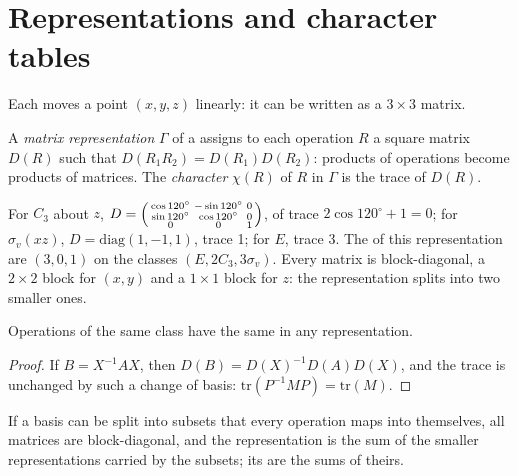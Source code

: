 \section{Representations and character tables}

Each  moves a point $(x, y, z)$ linearly: it can be written
as a $3\times3$ matrix.

\begin{definition}\label{def:b3:point-groups:representation}
A \emph{matrix representation} $\Gamma$ of a
 assigns to each operation $R$ a square matrix $D(R)$ such that
$D(R_1R_2) = D(R_1)D(R_2)$: products of operations become products of
matrices. The \emph{character} $\chi(R)$ of $R$ in $\Gamma$ is
the trace of $D(R)$.
\end{definition}

\begin{example}\label{ex:b3:point-groups:xyz}
For $C_3$ about $z$, $D = \begin{psmallmatrix}\cos120^\circ & -\sin120^\circ &
0\\ \sin120^\circ & \cos120^\circ & 0\\ 0 & 0 & 1\end{psmallmatrix}$, of trace
$2\cos120^\circ + 1 = 0$; for $\sigma_v(xz)$, $D = \mathrm{diag}(1, -1, 1)$, trace
1; for $E$, trace 3. The  of this representation are $(3, 0, 1)$ on
the classes $(E, 2C_3, 3\sigma_v)$. Every matrix is block-diagonal, a
$2\times2$ block for $(x, y)$ and a $1\times1$ block for $z$: the
representation splits into two smaller ones.
\end{example}

\begin{proposition}\label{prop:b3:point-groups:class-characters}
Operations of the same class have the same  in any representation.
\end{proposition}

\begin{proof}
If $B = X^{-1}AX$, then $D(B) = D(X)^{-1}D(A)D(X)$, and the trace is unchanged by
such a change of basis: $\mathrm{tr}(P^{-1}MP) = \mathrm{tr}(M)$.
\end{proof}

\begin{proposition}\label{prop:b3:point-groups:direct-sum}
If a basis can be split into subsets that every operation maps into
themselves, all matrices are block-diagonal, and the representation is the
sum of the smaller representations carried by the subsets; its 
are the sums of theirs.
\end{proposition}

